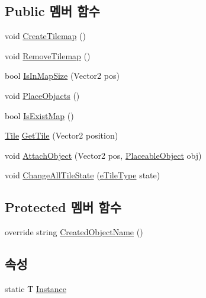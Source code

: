 \subsection*{Public 멤버 함수}
\begin{DoxyCompactItemize}
\item 
void \hyperlink{class_map_manager_aa6125f2ca4b3c4e8858f73f5e65d385b}{Create\+Tilemap} ()
\item 
void \hyperlink{class_map_manager_aac20afabde4946e32ce1e719c72e0f50}{Remove\+Tilemap} ()
\item 
bool \hyperlink{class_map_manager_a504d7a68ace64557bc3c3254a8b1cddc}{Is\+In\+Map\+Size} (Vector2 pos)
\item 
void \hyperlink{class_map_manager_a4213ccbaa1a81d0a47884de50a28de32}{Place\+Objacts} ()
\item 
bool \hyperlink{class_map_manager_a9a18efae73b0d690d2bc6c8ac8703a02}{Is\+Exist\+Map} ()
\item 
\hyperlink{class_tile}{Tile} \hyperlink{class_map_manager_ae457099efdd1a804add3b851b2bc7691}{Get\+Tile} (Vector2 position)
\item 
void \hyperlink{class_map_manager_ab8cbf46e369a9c59ff183a1b6c3b20bb}{Attach\+Object} (Vector2 pos, \hyperlink{class_placeable_object}{Placeable\+Object} obj)
\item 
void \hyperlink{class_map_manager_a68f796431393b7239320ab1f5200213a}{Change\+All\+Tile\+State} (\hyperlink{_tile_8cs_a271bc07be325bca511bcb747e0ff2fda}{e\+Tile\+Type} state)
\end{DoxyCompactItemize}
\subsection*{Protected 멤버 함수}
\begin{DoxyCompactItemize}
\item 
override string \hyperlink{class_map_manager_aa3459a9fe2d748c6e9f2c3da8a6273cd}{Created\+Object\+Name} ()
\end{DoxyCompactItemize}
\subsection*{속성}
\begin{DoxyCompactItemize}
\item 
static T \hyperlink{class_m_c_n_1_1_mono_singletone_aa50c027cca64cf4ad30c1ee5c83e0b78}{Instance}
\end{DoxyCompactItemize}
